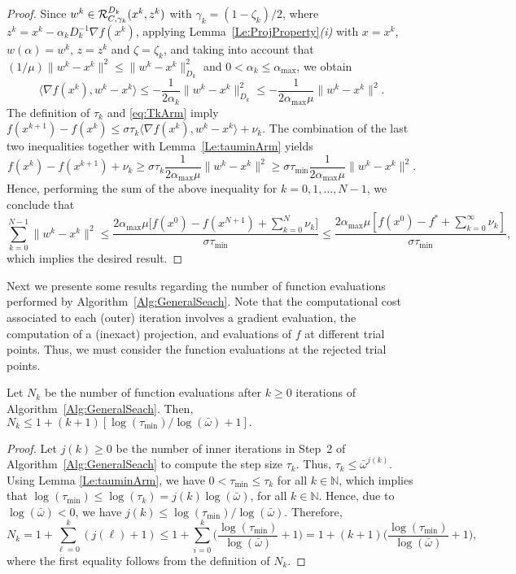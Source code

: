 \begin{proof}
	Since  $w^k \in   {\cal R}_{C,\gamma_k}^{D_k}(x^{k}, z^k)$ with    $\gamma_k=(1-\zeta_k)/2$, where $z^k = x^{k}-\alpha_k D^{-1} _k\nabla f(x^{k})$,  applying  Lemma~\ref{Le:ProjProperty}{\it (i)} with $x=x^k$, $w(\alpha) = w^k$, $z = z^k$ and $\zeta= \zeta_k$, and taking into account that $(1/\mu)  \|w^k-x^k\|^2 \leq  \|w^k-x^k\|_{D_k}^2$  and $0<\alpha_k \leq \alpha_{\max}$, we obtain
	\begin{equation*}\label{eq:fD2}
		\big\langle \nabla f(x^{k}), w^k-x^{k}\big\rangle \leq -\frac{1}{2\alpha_k} \|w^k-x^k\|_{D_k}^2\leq -\frac{1}{2\alpha_{\max}\mu} \|w^k-x^k\|^2.
	\end{equation*}
	The definition of $\tau_k$  and \eqref{eq:TkArm} imply  $f(x^{k+1}) - f(x^k) \leq \sigma\tau_k \big\langle \nabla f(x^{k}),  w^k-x^{k} \big\rangle+\nu_k$. The combination of the last two inequalities together with Lemma~\ref{Le:tauminArm} yields
	$$
		f(x^k) - f(x^{k+1})+\nu_k \geq \sigma\tau_k \frac{1}{2\alpha_{\max}\mu} \|w^k-x^k\|^2 \geq \sigma \tau_{\min} \frac{1}{2\alpha_{\max}\mu} \|w^k-x^k\|^2.
	$$
	Hence, performing the sum of the above inequality for $k= 0, 1,\ldots, N-1$, we conclude that
	$$
		\sum_{k= 0}^{N-1} \|w^k - x^k\|^2 \leq \frac{2{\alpha_{\max}}\mu \big[f(x^0) - f(x^{N+1})+ \sum_{k= 0}^{N}\nu_k\big]}{\sigma \tau_{\min}}\leq \frac{2{\alpha_{\max}}\mu \left[ f(x^0) - f^*+ \sum_{k= 0}^{\infty}\nu_k\right]}{\sigma \tau_{\min}},
	$$
	which implies the desired result.
\end{proof}
{Next we presente} some results regarding the  number of function evaluations performed by Algorithm~\ref{Alg:GeneralSeach}.
Note that the computational cost associated to each (outer) iteration involves a gradient evaluation, the computation of a (inexact) projection, and evaluations of $f$ at different trial points.
Thus, we must consider the function evaluations at the rejected trial points.
\begin{lemma} \label{eq:nfeas}
	Let $N_{k}$ be  the number of function evaluations after $k\geq 0$ iterations of Algorithm~\ref{Alg:GeneralSeach}. Then,  $N_{k}\leq 1+ (k+1)[\log (\tau_{\min})/\log (\bar\omega)+1].$
\end{lemma}
\begin{proof}
	Let $j(k)\geq 0$ be the number of inner iterations in Step~2 of Algorithm~\ref{Alg:GeneralSeach} to compute the step size $\tau_k$.  Thus, $\tau_k\leq {\bar\omega}^{j(k)}$.
	Using Lemma \ref {Le:tauminArm}, we have  $0< \tau_{\min}\leq  \tau _{k}$ for all  $k\in \mathbb{N}$, which implies that  $ \log \left( \tau_{\min} \right) \leq \log (\tau _{k})=j(k) \log (\bar\omega)$, for all $k \in \mathbb{N}$.  Hence, due to  $\log(\bar\omega) <0$, we have $ j(k) \leq \log (\tau_{\min})/\log (\bar\omega)$. Therefore,
	$$
		N_k =	1+ \sum _{\ell=0}^{k}(j(\ell)+1)\leq 1+  \sum _{i=0}^{k} \Big(\frac{\log (\tau_{\min})}{\log (\bar\omega)} +1\Big)= 1+(k+1) \Big(\frac{\log (\tau_{\min})}{\log (\bar\omega)}+1\Big),
	$$
	where the first equality follows from the definition of $N_k$.
\end{proof}
